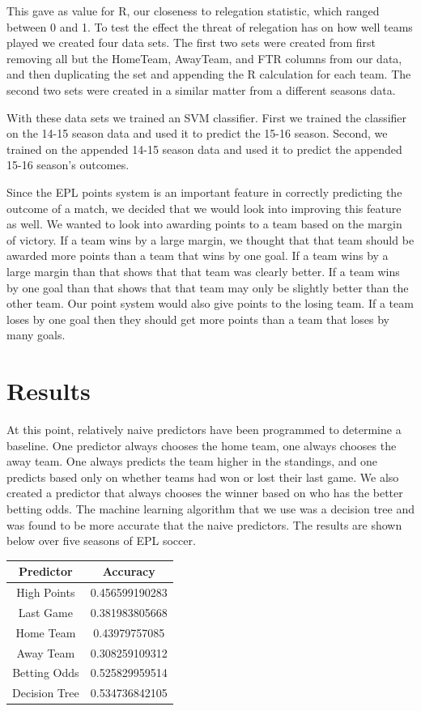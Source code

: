\documentclass[conference]{IEEEtran}
\begin{document}
This gave as value for R, our closeness to relegation statistic, which ranged between 0 and 1. To test the effect the threat of relegation has on how well teams played we created four data sets. The first two sets were created from first removing all but the HomeTeam, AwayTeam, and FTR columns from our data, and then duplicating the set and appending the R calculation for each team. The second two sets were created in a similar matter from a different seasons data.

With these data sets we trained an SVM classifier. First we trained the classifier on the 14-15 season data and used it to predict the 15-16 season. Second, we trained on the appended 14-15 season data and used it to predict the appended 15-16 season's outcomes.

Since the EPL points system is an important feature in correctly predicting the outcome of a match, we decided that we would look into improving this feature as well. We wanted to look into awarding points to a team based on the margin of victory. If a team wins by a large margin, we thought that that team should be awarded more points than a team that wins by one goal. If a team wins by a large margin than that shows that that team was clearly better. If a team wins by one goal than that shows that that team may only be slightly better than the other team. Our point system would also give points to the losing team. If a team loses by one goal then they should get more points than a team that loses by many goals.

\section{Results}

 At this point, relatively naive predictors have been programmed to determine a baseline. One predictor always chooses the home team, one always chooses the away team. One always predicts the team higher in the standings, and one predicts based only on whether teams had won or lost their last game. We also created a predictor that always chooses the winner based on who has the better betting odds. The machine learning algorithm that we use was a decision tree and was found to be more accurate that the naive predictors. The results are shown below over five seasons of EPL soccer.

\begin{center}
  \begin{tabular}{@{} cc @{}}
    \hline
    Predictor & Accuracy \\ 
    \hline
High Points & 0.456599190283 \\ 
    Last Game & 0.381983805668\\ 
    Home Team & 0.43979757085 \\ 
    Away Team & 0.308259109312\\ 
    Betting Odds & 0.525829959514\\
    Decision Tree & 0.534736842105\\
    \hline
  \end{tabular}
\end{center}
\end{document}
